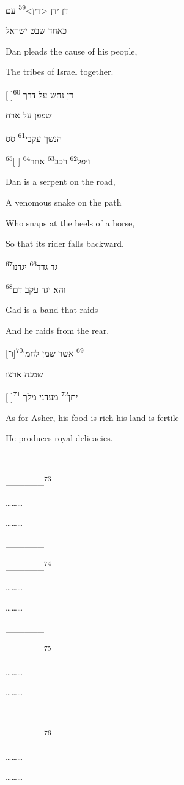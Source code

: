 {
	דן ידן <דין>\textsuperscript{59} עם

	כאחד שבט ישראל
}
{
	Dan pleads the cause of his people,

	The tribes of Israel together.
}
{
}

{
	[ ]\textsuperscript{60} דן נחש על דרך

	שפפן על ארח

	הנשך עקבי\textsuperscript{61} סס

	ויפל\textsuperscript{62} רכב\textsuperscript{63} אחר\textsuperscript{64} [ ]\textsuperscript{65}
}
{
	Dan is a serpent on the road,

	A venomous snake on the path

	Who snaps at the heels of a horse,

	So that its rider falls backward.
}
{
}

{
	גד גדד\textsuperscript{66} יגדנו\textsuperscript{67}

	והא יגד עקב דם\textsuperscript{68}
}
{
	Gad is a band that raids

	And he raids from the rear.
}
{
}

{
	[ו־]\textsuperscript{69} אשר שמן לחמו\textsuperscript{70}

	שמנה ארצו

	[ ]\textsuperscript{71} יתן\textsuperscript{72} מעדני מלך
}
{
	As for Asher,
	his food is rich
	his land is fertile

	He produces royal delicacies.
}
{
}

{
	\_\_\_\_\_\_

	\_\_\_\_\_\_\textsuperscript{73}
}
{
	\ldots\ldots\ldots

	\ldots\ldots\ldots
}
{
}

{
	\_\_\_\_\_\_

	\_\_\_\_\_\_\textsuperscript{74}

}
{
	\ldots\ldots\ldots

	\ldots\ldots\ldots
}
{
}

{
	\_\_\_\_\_\_

	\_\_\_\_\_\_\textsuperscript{75}
}
{
	\ldots\ldots\ldots

	\ldots\ldots\ldots
}
{
}

{
	\_\_\_\_\_\_

	\_\_\_\_\_\_\textsuperscript{76}
}
{
	\ldots\ldots\ldots

	\ldots\ldots\ldots
}
{
}

{
}
{
}

